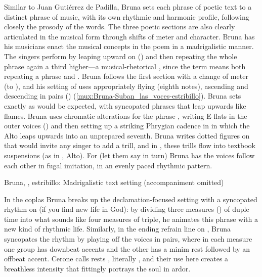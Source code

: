 Similar to Juan Gutiérrez de Padilla, Bruna sets each phrase of poetic text to
a distinct phrase of music, with its own rhythmic and harmonic profile,
following closely the prosody of the words.  
The three poetic sections are also clearly articulated in the musical form
through shifts of meter and character.
Bruna has his musicians enact the musical concepts in the poem in a
madrigalistic manner.  
The singers perform  by leaping upward on
 () and then repeating the whole phrase again a
third higher---a musical-rhetorical , since the term means both
repeating a phrase and .
Bruna follows the first section with a change of meter (to \meterC), and his
setting of  uses appropriately
flying  (eighth notes), ascending and descending in pairs
() (\cref{mux:Bruna-Suban_las_voces-estribillo}).
Bruna sets  exactly as would be expected, with
syncopated phrases that leap upwards like flames.
Bruna uses chromatic alterations for the phrase ,
writing E flats in the outer voices () and then setting up a
striking Phrygian cadence in  in which the Alto leaps upwards
into an unprepared seventh.  
Bruna writes dotted figures on  that would
invite any singer to add a trill, and in , these trills flow
into textbook suspensions (as in , Alto).
For  (let them say in turn) Bruna has the voices follow
each other in fugal imitation, in an evenly paced rhythmic pattern.


{Bruna, , estribillo: Madrigalistic text setting
(accompaniment omitted)}

In the coplas Bruna breaks up the declamation-focused setting with a syncopated
rhythm on  (if you find new life in God):
by dividing three measures () of duple time into what sounds
like four measures of triple, he animates this phrase with a new kind of
rhythmic life. 
Similarly, in the ending refrain line on , Bruna syncopates the
rhythm by playing off the voices in pairs, where in each measure one group has
downbeat accents and the other has a minim rest followed by an offbeat accent.
Cerone calls rests , literally , and their use
here creates a breathless intensity that fittingly portrays the soul in ardor.%
    \Autocite[\XXX]{Cerone:Melopeo}

